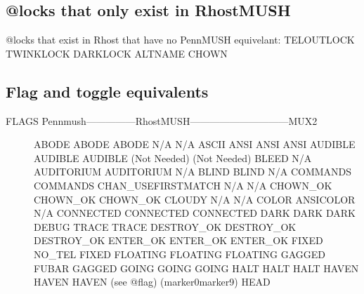 \documentclass[letterpaper,10pt,english]{sphinxmanual}
\begin{document}
\subsection{@locks that only exist in RhostMUSH}
\label{\detokenize{differences:locks-that-only-exist-in-rhostmush}}
\sphinxAtStartPar
@locks that exist in Rhost that have no PennMUSH equivelant:
TELOUTLOCK                   TWINKLOCK                     DARKLOCK
ALTNAME                      CHOWN


\subsection{Flag and toggle equivalents}
\label{\detokenize{differences:flag-and-toggle-equivalents}}\begin{description}
\item[{FLAGS Pennmush—————\sphinxhyphen{}RhostMUSH——————————MUX2}] \leavevmode
\sphinxAtStartPar
ABODE                   ABODE                                  ABODE
N/A                     N/A                                    ASCII
ANSI                    ANSI                                   ANSI
AUDIBLE                 AUDIBLE                                AUDIBLE
(Not Needed)            (Not Needed)                           BLEED
N/A                     AUDITORIUM                             AUDITORIUM
N/A                     BLIND                                  BLIND
N/A                     COMMANDS                               COMMANDS
CHAN\_USEFIRSTMATCH      N/A                                    N/A
CHOWN\_OK                CHOWN\_OK                               CHOWN\_OK
CLOUDY                  N/A                                    N/A
COLOR                   ANSICOLOR                              N/A
CONNECTED               CONNECTED                              CONNECTED
DARK                    DARK                                   DARK
DEBUG                   TRACE                                  TRACE
DESTROY\_OK              DESTROY\_OK                             DESTROY\_OK
ENTER\_OK                ENTER\_OK                               ENTER\_OK
FIXED                   NO\_TEL                                 FIXED
FLOATING                FLOATING                               FLOATING
GAGGED                  FUBAR                                  GAGGED
GOING                   GOING                                  GOING
HALT                    HALT                                   HALT
HAVEN                   HAVEN                                  HAVEN
(see @flag)             (marker0\sphinxhyphen{}marker9)                      HEAD

\end{description}
\end{document}
